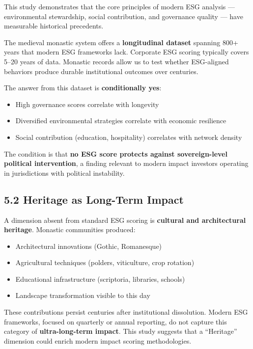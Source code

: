 \documentclass[
  11pt,
  a4paper,
]{article}
\providecommand{\tightlist}{%
  \setlength{\itemsep}{0pt}\setlength{\parskip}{0pt}}\usepackage{longtable,booktabs,array}
\begin{document}
This study demonstrates that the core principles of modern ESG analysis
--- environmental stewardship, social contribution, and governance
quality --- have measurable historical precedents.

The medieval monastic system offers a \textbf{longitudinal dataset}
spanning 800+ years that modern ESG frameworks lack. Corporate ESG
scoring typically covers 5--20 years of data. Monastic records allow us
to test whether ESG-aligned behaviors produce durable institutional
outcomes over centuries.

The answer from this dataset is \textbf{conditionally yes}:

\begin{itemize}
\tightlist
\item
  High governance scores correlate with longevity
\item
  Diversified environmental strategies correlate with economic
  resilience
\item
  Social contribution (education, hospitality) correlates with network
  density
\end{itemize}

The condition is that \textbf{no ESG score protects against
sovereign-level political intervention}, a finding relevant to modern
impact investors operating in jurisdictions with political instability.

\subsection{5.2 Heritage as Long-Term
Impact}\label{heritage-as-long-term-impact}

A dimension absent from standard ESG scoring is \textbf{cultural and
architectural heritage}. Monastic communities produced:

\begin{itemize}
\tightlist
\item
  Architectural innovations (Gothic, Romanesque)
\item
  Agricultural techniques (polders, viticulture, crop rotation)
\item
  Educational infrastructure (scriptoria, libraries, schools)
\item
  Landscape transformation visible to this day
\end{itemize}

These contributions persist centuries after institutional dissolution.
Modern ESG frameworks, focused on quarterly or annual reporting, do not
capture this category of \textbf{ultra-long-term impact}. This study
suggests that a ``Heritage'' dimension could enrich modern impact
scoring methodologies.
\end{document}
